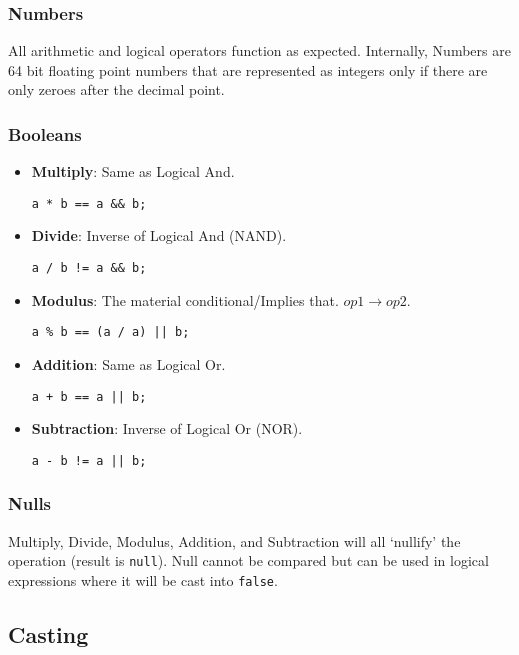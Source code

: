 \subsubsection{Numbers}

All arithmetic and logical operators function as expected. Internally, Numbers are 64 bit floating point numbers that are represented as integers only if there are only zeroes after the decimal point.

\subsubsection{Booleans}

\begin{itemize}
    \item \textbf{Multiply}: Same as Logical And.
    \begin{verbatim}
a * b == a && b;
    \end{verbatim}
    \item \textbf{Divide}: Inverse of Logical And (NAND).
    \begin{verbatim}
a / b != a && b;
    \end{verbatim}
    \item \textbf{Modulus}: The material conditional/Implies that. $op1 \rightarrow op2$.
    \begin{verbatim}
a % b == (a / a) || b;
    \end{verbatim}
    \item \textbf{Addition}: Same as Logical Or.
    \begin{verbatim}
a + b == a || b;
    \end{verbatim}
    \item \textbf{Subtraction}: Inverse of Logical Or (NOR).
    \begin{verbatim}
a - b != a || b;
    \end{verbatim}
\end{itemize}

\subsubsection{Nulls}

Multiply, Divide, Modulus, Addition, and Subtraction will all `nullify' the operation (result is \verb|null|). Null cannot be compared but can be used in logical expressions where it will be cast into \verb|false|.

\subsection{Casting}

